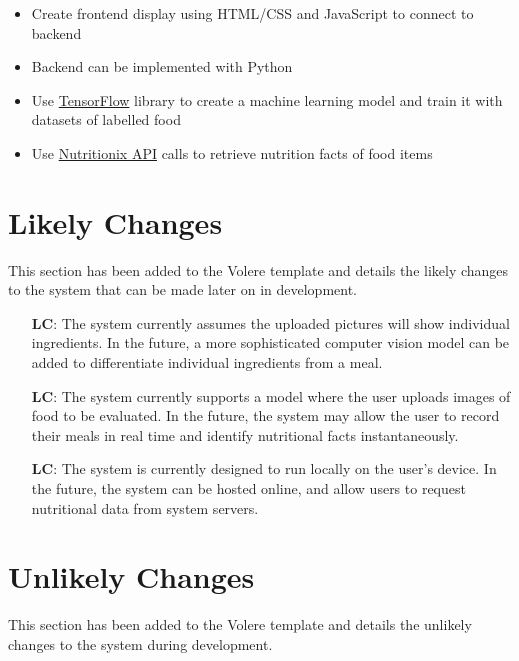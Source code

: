 \documentclass[12pt]{article}
\newcounter{lcnum} %
\begin{document}
\begin{itemize}
	\item Create frontend display using HTML/CSS and JavaScript to connect to backend
	\item Backend can be implemented with Python
	\item Use \href{https://www.tensorflow.org/}{TensorFlow} library to create a machine learning model and train it with datasets of labelled food
	\item Use \href{https://www.nutritionix.com/business/api}{Nutritionix API} calls to retrieve nutrition facts of food items
\end{itemize}

\section{Likely Changes}   
This section has been added to the Volere template and details the likely changes to the system that can be made later on in development.

\noindent \begin{itemize}

\item[\textbf{LC\refstepcounter{lcnum}\thelcnum\label{LC_meaningfulLabel}}:] 
The system currently assumes the uploaded pictures will 
show individual ingredients. In the future, a more sophisticated computer 
vision model can be added to differentiate individual ingredients from a meal.

\item[\textbf{LC\refstepcounter{lcnum}\thelcnum\label{LC_meaningfulLabel}}:] 
The system currently supports a model where the user uploads images of food to 
be evaluated. In the future, the system may allow the user to record their 
meals in real time and identify nutritional facts instantaneously.

\item[\textbf{LC\refstepcounter{lcnum}\thelcnum\label{LC_meaningfulLabel}}:] 
The system is currently designed to run locally on the user's device. In the 
future, the system can be hosted online, and allow users to request nutritional 
data from system servers.

\end{itemize}

\section{Unlikely Changes}  
This section has been added to the Volere template and details the unlikely changes to the system during development.  
\end{document}

